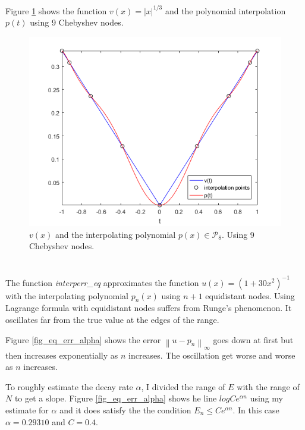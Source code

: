 \documentclass[12pt]{article}
\newcommand{\norm}[1]{\left\lVert#1\right\rVert}
\newcommand{\abs}[1]{\left|#1\right|}
\begin{document}
\subsection{} %

Figure \ref{fig_vt_pt} shows the function $v(x) = \abs{x}^{1/3}$ and the polynomial interpolation $p(t)$ using 9 Chebyshev nodes.

\begin{figure}
    \includegraphics[width=.6\linewidth]{vt_pt}
    \centering
    \caption{$v(x)$ and the interpolating polynomial $p(x) \in \mathcal{P}_{8}$. Using 9 Chebyshev nodes.}
    \label{fig_vt_pt}
\end{figure}


\section{} %

\subsection{} %
The function \textit{interperr\_eq} approximates the function $u(x) = (1+30x^2)^{-1}$ with the interpolating polynomial $p_n(x)$ using $n+1$ equidistant nodes. Using Lagrange formula with equidistant nodes suffers from Runge's phenomenon. It oscillates far from the true value at the edges of the range.

Figure \ref{fig_eq_err_alpha} shows the error $\norm{u-p_n}_{\infty}$ goes down at first but then increases exponentially as $n$ increases. The oscillation get worse and worse as $n$ increases.

To roughly estimate the decay rate $\alpha$, I divided the range of $E$ with the range of $N$ to get a slope. Figure \ref{fig_eq_err_alpha} shows he line $log Ce^{\alpha n}$ using my estimate for $\alpha$ and it does satisfy the the condition $E_n \le Ce^{\alpha n}$.
In this case $\alpha = 0.29310$ and $C = 0.4$.
\end{document}
